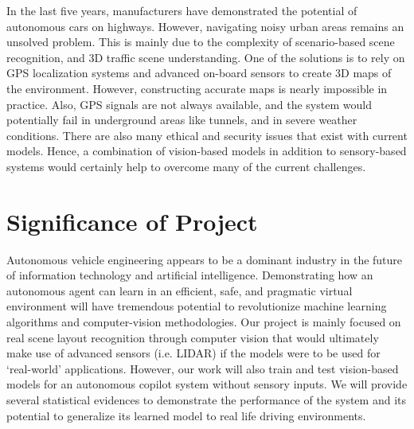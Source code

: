 In the last five years, manufacturers have demonstrated the potential of autonomous cars on highways. However, navigating noisy urban areas remains an unsolved problem. This is mainly due to the complexity of scenario-based scene recognition, and 3D traffic scene understanding. One of the solutions is to rely on GPS localization systems and advanced on-board sensors to create 3D maps of the environment. However, constructing accurate maps is nearly impossible in practice. Also, GPS signals are not always available, and the system would potentially fail in underground areas like tunnels, and in severe weather conditions.  There are also many ethical and security issues that exist with current models. Hence, a combination of vision-based models in addition to sensory-based systems would certainly help to overcome many of the current challenges. 




\section{Significance of Project} 

Autonomous vehicle engineering appears to be a dominant industry in the future of information technology and artificial intelligence.  Demonstrating how an autonomous agent can learn in an efficient, safe, and pragmatic virtual environment will have tremendous potential to revolutionize machine learning algorithms and computer-vision methodologies. Our project is mainly focused on real scene layout recognition through computer vision that would ultimately make use of advanced sensors (i.e. LIDAR) if the models were to be used for `real-world' applications. However, our work will also train and test vision-based models for an autonomous copilot system without sensory inputs. We will provide several statistical evidences to demonstrate the performance of the system and its potential to generalize its learned model to real life driving environments. 
 
